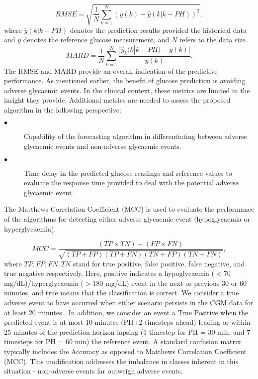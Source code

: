 \documentclass[a4paper, 10 pt, twocolumn]{IEEEtran}
\begin{document}
\begin{equation}\label{eq:RMSE}
  RMSE = \sqrt{\frac{1}{N}\displaystyle\sum_{k=1}^{N}(y(k)-\hat{y}(k|k-PH))^2},
\end{equation}
where $\hat{y}(k|k-PH)$ denotes the prediction results provided the historical data and $y$ denotes the reference glucose measurement, and $N$ refers to the data size.
\begin{equation}\label{eq:MARD}
  MARD = \frac{1}{N}\sum_{k=1}^{N}\frac{|\hat{y}_k(k|k-PH)-y(k)|}{y(k)}.
\end{equation}
The RMSE and MARD provide an overall indication of the predictive performance.
As mentioned earlier, the benefit of glucose prediction is avoiding adverse glycaemic events. In the clinical context, these metrics are limited in the insight they provide. Additional metrics are needed to assess the
proposed algorithm in the following perspective:
\begin{description}
	\item[$\bullet$] Capability of the forecasting algorithm in differentiating between adverse glycaemic events and non-adverse glycaemic events.
	\item[$\bullet$] Time delay in the predicted glucose readings and reference values to evaluate the response time provided to deal with the potential adverse glycaemic event.
\end{description}

The Matthews Correlation Coefficient (MCC)
is used to evaluate the performance of the algorithms for detecting either adverse glycaemic event (hypoglycaemia or hyperglycaemia).

\begin{equation}\label{eq:AccSen}
   MCC \!=\! \frac{(TP\times TN)\!-\!(FP\times FN)}{\sqrt{(TP\!+\!FP)(TP\!+\!FN)(TN\!+\!FP)(TN\!+\!FN)}} ,
  \end{equation}
where $TP, FP, FN, TN$ stand for true positive, false positive, false negative, and true negative respectively. Here, positive indicates a hypoglycaemia ($<70$ mg/dL)/hyperglycaemia ($>180$ mg/dL) event in the next or
previous 30 or 60 minutes, and true means that the classification is correct.  We consider a true adverse event to have occurred when either scenario persists in the CGM data for at least 20 minutes
\cite{international_hypoglycaemia_study_group_glucose_2017}. In addition, we consider an event a True Positive when the predicted event is at most 10 minutes (PH+2 timesteps ahead) leading or within 25 minutes of the
prediction horizon lapsing (1 timestep for PH = 30 min, and 7 timesteps for PH = 60 min) the reference event.
A standard confusion matrix typically includes the Accuracy as opposed to Matthews Correlation Coefficient (MCC). This modification addresses the imbalance in classes inherent in this situation - non-adverse events far
outweigh adverse events.
\end{document}
